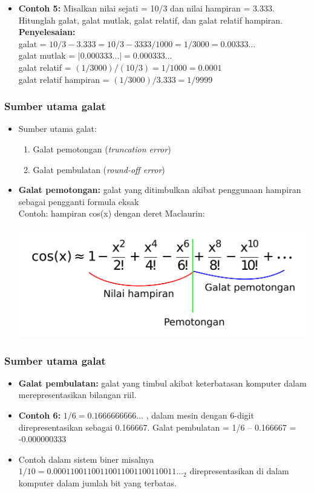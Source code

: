 \documentclass[pdflatex,compress]{beamer}
\begin{document}
\begin{frame}
	\begin{itemize}
		\item \textbf{Contoh 5:} Misalkan nilai sejati = 10/3 dan nilai hampiran = 3.333. Hitunglah galat, galat mutlak, galat relatif, dan galat relatif hampiran.\\
		\textbf{Penyelesaian:}\\
		galat = $10/3 - 3.333 = 10/3 - 3333/1000 = 1/3000 = 0.00333...$\\
		galat mutlak = $ |0.000333...| = 0.000333... $\\
		galat relatif = $ (1/3000)/(10/3) = 1/1000 = 0.0001 $\\
		galat relatif hampiran = $ (1/3000)/3.333 = 1/9999 $
	\end{itemize}
\end{frame}

\begin{frame}
	\frametitle{Sumber utama galat}
	\begin{itemize}
		\item Sumber utama galat:
		\begin{enumerate}
			\item Galat pemotongan (\textit{truncation error})
			\item Galat pembulatan (\textit{round-off error})
		\end{enumerate}
		\item \textbf{Galat pemotongan:} galat yang ditimbulkan akibat penggunaan hampiran sebagai pengganti formula eksak\\
		Contoh: hampiran cos(x) dengan deret Maclaurin:\\
		\begin{center}
			\includegraphics[width=0.6\linewidth]{img/img102.png}
		\end{center}
	\end{itemize}
\end{frame}

\begin{frame}
	\frametitle{Sumber utama galat}
	\begin{itemize}
		\item \textbf{Galat pembulatan:} galat yang timbul akibat keterbatasan komputer dalam merepresentasikan bilangan riil.
		\item \textbf{Contoh 6:} $ 1/6 =  0.1666666666 \dots $ , dalam mesin dengan 6-digit direpresentasikan sebagai 0.166667. Galat pembulatan = 1/6 – 0.166667 = -0.000000333
		\item Contoh dalam sistem biner misalnya $1/10 =  0.00011001100110011001100110011\dots_2 $ direpresentasikan di dalam komputer dalam jumlah bit yang terbatas. 
	\end{itemize}
\end{frame}
\end{document}
